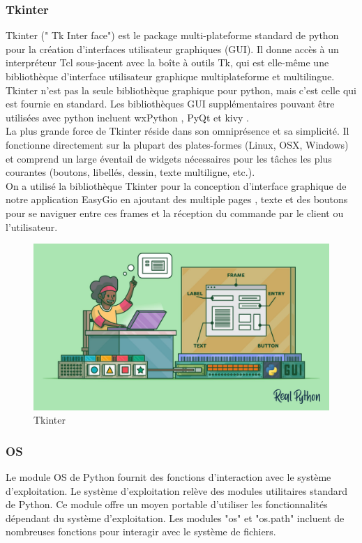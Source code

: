 \documentclass[a4paper]{report}
\begin{document}
\subsubsection{Tkinter}
Tkinter (" Tk Inter face") est le package multi-plateforme standard de python pour la création d'interfaces utilisateur graphiques (GUI). Il donne accès à un interpréteur Tcl sous-jacent avec la boîte à outils Tk, qui est elle-même une bibliothèque d'interface utilisateur graphique multiplateforme et multilingue.
Tkinter n'est pas la seule bibliothèque graphique pour python, mais c'est celle qui est fournie en standard. Les bibliothèques GUI supplémentaires pouvant être utilisées avec python incluent wxPython , PyQt et kivy .\\
La plus grande force de Tkinter réside dans son omniprésence et sa simplicité. Il fonctionne directement sur la plupart des plates-formes (Linux, OSX, Windows) et comprend un large éventail de widgets nécessaires pour les tâches les plus courantes (boutons, libellés, dessin, texte
multiligne, etc.).\\
On a utilisé la bibliothèque Tkinter pour la conception d'interface graphique de notre application EasyGio  en ajoutant des multiple pages , texte et des boutons pour se naviguer entre ces frames et la réception du commande par le client ou l'utilisateur. 
\begin{figure}[!h]
    \centering
    \includegraphics[width=13cm]{images/Tkinter.png}
    \caption{Tkinter}
    \label{Tkinter}
\end{figure}
\subsubsection{OS}
Le module OS de Python fournit des fonctions d'interaction avec le système d'exploitation. Le système d'exploitation relève des modules utilitaires standard de Python. Ce module offre un moyen portable d'utiliser les fonctionnalités dépendant du système d'exploitation. Les modules "os" et "os.path" incluent de nombreuses fonctions pour interagir avec le système de fichiers.
\end{document}
